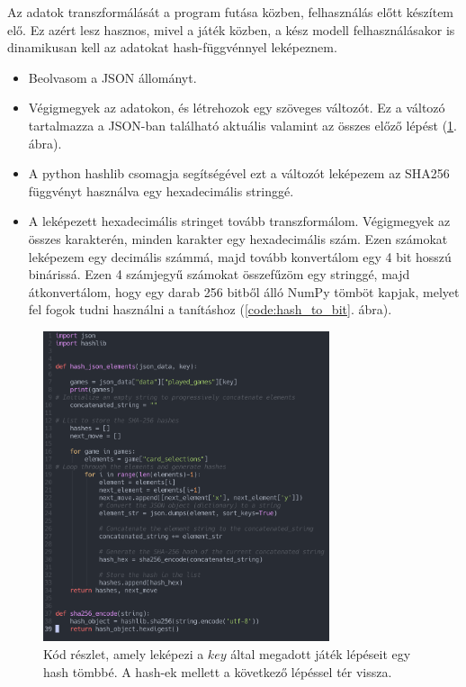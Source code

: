 Az adatok transzformálását a program futása közben, felhasználás előtt készítem elő. Ez azért lesz hasznos, mivel a játék közben, a kész modell felhasználásakor is dinamikusan kell az adatokat hash-függvénnyel leképeznem.

\begin{itemize}
    \item Beolvasom a JSON állományt. 
    \item Végigmegyek az adatokon, és létrehozok egy szöveges változót. Ez a változó tartalmazza a JSON-ban található aktuális valamint az összes előző lépést  (\ref{code:json_to_hash}. ábra). 
    \item A python hashlib csomagja segítségével ezt a változót leképezem az SHA256 függvényt használva egy hexadecimális stringgé. 
    \item A leképezett hexadecimális stringet tovább transzformálom. 
    Végigmegyek az összes karakterén, minden karakter egy hexadecimális szám. Ezen számokat leképezem egy decimális számmá, majd tovább konvertálom egy 4 bit hosszú binárissá. Ezen 4 számjegyű számokat összefűzöm egy stringgé, majd átkonvertálom, hogy egy darab 256 bitből álló NumPy tömböt kapjak, melyet fel fogok tudni használni a tanításhoz (\ref{code:hash_to_bit}. ábra). 
\end{itemize}

\begin{figure}[h]
    \center
    \includegraphics[width=0.75\textwidth]{img/JSON_TO_SHA256.png}
    \caption{Kód részlet, amely leképezi a $key$ által megadott játék lépéseit egy hash tömbbé. A hash-ek mellett a következő lépéssel tér vissza.}
    \label{code:json_to_hash}
\end{figure}

